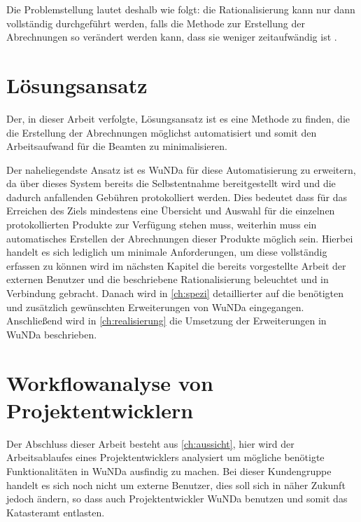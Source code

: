 Die Problemstellung lautet deshalb wie folgt: die Rationalisierung kann nur dann vollständig durchgeführt werden, falls die Methode zur Erstellung der Abrechnungen so verändert werden kann, dass sie weniger zeitaufwändig ist \autocite[vgl.][]{sander-abrechnung}. 


\section{Lösungsansatz}

Der, in dieser Arbeit verfolgte, Lösungsansatz ist es eine Methode zu finden, die die Erstellung der Abrechnungen möglichst automatisiert und somit den Arbeitsaufwand für die Beamten zu minimalisieren. 

Der naheliegendste Ansatz ist es \acs{WuNDa} für diese Automatisierung zu erweitern, da über dieses System bereits die Selbstentnahme bereitgestellt wird und die dadurch anfallenden Gebühren protokolliert werden.
Dies bedeutet dass für das Erreichen des Ziels mindestens eine Übersicht und Auswahl für die einzelnen protokollierten Produkte zur Verfügung stehen muss, weiterhin muss ein automatisches Erstellen der Abrechnungen dieser Produkte möglich sein.
Hierbei handelt es sich lediglich um minimale Anforderungen, um diese vollständig erfassen zu können wird im nächsten Kapitel die bereits vorgestellte Arbeit der externen Benutzer und die beschriebene Rationalisierung beleuchtet und in Verbindung gebracht.
Danach wird in \autoref{ch:spezi} detaillierter auf die benötigten und zusätzlich gewünschten Erweiterungen von \ac{WuNDa} eingegangen.
Anschließend wird in \autoref{ch:realisierung} die Umsetzung der Erweiterungen in \ac{WuNDa} beschrieben.

\section{Workflowanalyse von Projektentwicklern}
Der Abschluss dieser Arbeit besteht aus \autoref{ch:aussicht}, hier wird der Arbeitsablaufes eines Projektentwicklers analysiert um mögliche benötigte Funktionalitäten in \ac{WuNDa} ausfindig zu machen.
Bei dieser Kundengruppe handelt es sich noch nicht um externe Benutzer, dies soll sich in näher Zukunft jedoch ändern, so dass auch Projektentwickler \ac{WuNDa} benutzen und somit das Katasteramt entlasten.



